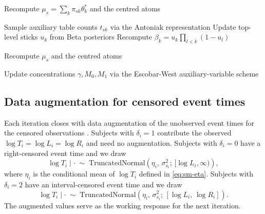 \begin{algorithm}[H]
\caption{Update of the HDPM error block.}
\label{alg:sm-hdp}
\vspace{1ex}

\vspace{1ex}

Recompute $\mu_s = \sum_k \pi_{sk} \theta_k^*$ and the centred atoms\;
\vspace{1ex}

Sample auxiliary table counts $t_{sk}$ via the Antoniak representation\;
Update top-level sticks $u_k$ from Beta posteriors\;
Recompute $\beta_k = u_k \prod_{l < k}(1 - u_l)$\;
\vspace{1ex}

Recompute $\mu_s$ and the centred atoms\;
\vspace{1ex}

Update concentrations $\gamma, M_0, M_1$ via the Escobar-West auxiliary-variable scheme\;
\vspace{1ex}

\end{algorithm}

\subsection{Data augmentation for censored event times}

Each iteration closes with data augmentation of the unobserved event times for the censored observations \citep{tanner1987}.
Subjects with $\delta_i = 1$ contribute the observed $\log T_i = \log L_i = \log R_i$ and need no augmentation.
Subjects with $\delta_i = 0$ have a right-censored event time and we draw
\begin{equation}
\log T_i \mid \cdot \;\sim\; \mathrm{TruncatedNormal}\!\left(\eta_i,\, \sigma_{s_i}^2;\, [\log L_i, \infty)\right),
\end{equation}
where $\eta_i$ is the conditional mean of $\log T_i$ defined in \eqref{eq:sm-eta}.
Subjects with $\delta_i = 2$ have an interval-censored event time and we draw
\begin{equation}
\log T_i \mid \cdot \;\sim\; \mathrm{TruncatedNormal}\!\left(\eta_i,\, \sigma_{s_i}^2;\, [\log L_i,\, \log R_i]\right).
\end{equation}
The augmented values serve as the working response for the next iteration.

